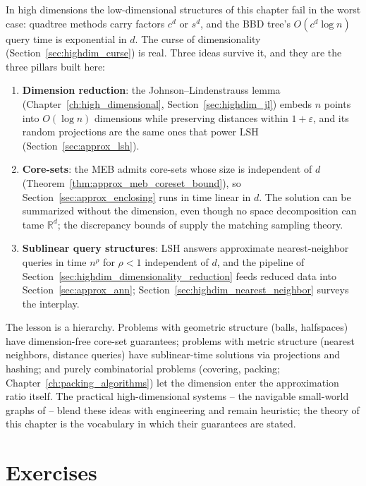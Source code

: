 In high dimensions the low-dimensional structures of this chapter fail in
the worst case: quadtree methods carry factors $c^d$ or $s^d$, and the BBD
tree's $O(c^d \log n)$ query time is exponential in $d$. The curse of
dimensionality (Section~\ref{sec:highdim_curse}) is real. Three ideas
survive it, and they are the three pillars built here:
\begin{enumerate}
  \item \textbf{Dimension reduction}: the Johnson--Lindenstrauss lemma
    (Chapter~\ref{ch:high_dimensional}, Section~\ref{sec:highdim_jl})
    embeds $n$ points into $O(\log n)$ dimensions while preserving distances
    within $1 + \varepsilon$, and its random projections are the same ones
    that power LSH (Section~\ref{sec:approx_lsh}).
  \item \textbf{Core-sets}: the MEB admits core-sets whose size is
    independent of $d$ (Theorem~\ref{thm:approx_meb_coreset_bound}), so
    Section~\ref{sec:approx_enclosing} runs in time linear in $d$. The
    solution can be summarized without the dimension, even though no space
    decomposition can tame $\mathbb{R}^d$; the discrepancy bounds of
    \cite{matousek1999} supply the matching sampling theory.
  \item \textbf{Sublinear query structures}: LSH answers approximate
    nearest-neighbor queries in time $n^{\rho}$ for $\rho < 1$ independent
    of $d$, and the pipeline of
    Section~\ref{sec:highdim_dimensionality_reduction} feeds reduced data
    into Section~\ref{sec:approx_ann};
    Section~\ref{sec:highdim_nearest_neighbor} surveys the interplay.
\end{enumerate}

The lesson is a hierarchy. Problems with geometric structure (balls,
halfspaces) have dimension-free core-set guarantees; problems with metric
structure (nearest neighbors, distance queries) have sublinear-time
solutions via projections and hashing; and purely combinatorial problems
(covering, packing; Chapter~\ref{ch:packing_algorithms}) let the dimension
enter the approximation ratio itself. The practical high-dimensional
systems -- the navigable small-world graphs of \cite{malkov2018} -- blend
these ideas with engineering and remain heuristic; the theory of this
chapter is the vocabulary in which their guarantees are stated.


\section{Exercises}
\label{sec:approx_exercises}

